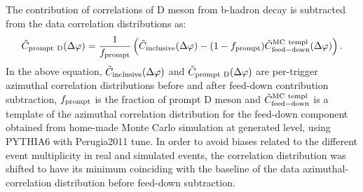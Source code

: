 \label{feeddown}

%
%
The contribution of correlations of D meson from b-hadron decay is subtracted from the data correlation distributions as:
\begin{equation}
\tilde{C}_{\rm prompt~D}(\Delta\varphi)=\frac{1}{f_{\rm prompt}}\left(\tilde{C}_{\rm inclusive}(\Delta\varphi)-(1-f_{\rm prompt})\tilde{C}_{\rm feed-down}^{\rm MC~templ}(\Delta\varphi) \right).
\label{eqFeedDown}
\end{equation}
In the above equation, $\tilde{C}_{\rm inclusive}(\Delta\varphi)$ and $\tilde{C}_{\rm prompt~D}(\Delta\varphi)$ are per-trigger azimuthal correlation distributions before and after
feed-down contribution subtraction, $f_{\rm prompt}$ is the fraction of prompt D meson and $\tilde{C}_{\rm feed-down}^{\rm MC~templ}$ is a template
of the azimuthal correlation distribution for the feed-down component obtained from home-made Monte Carlo simulation at generated level, using PYTHIA6 with Perugia2011 tune.
In order to avoid biases related to the different event multiplicity in real and simulated events, the correlation distribution was shifted to have its minimum coinciding with the baseline of the data azimuthal-correlation distribution before feed-down subtraction. %

